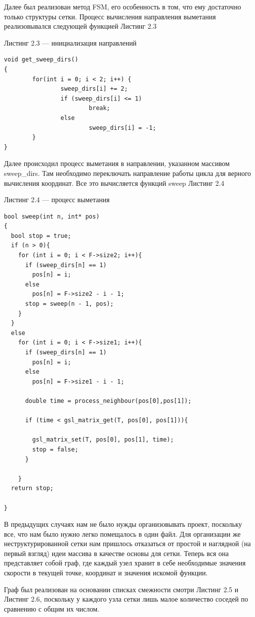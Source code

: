 Далее был реализован метод FSM, его особенность в том, что ему
достаточно только структуры сетки. Процесс вычисления направления
выметания реализовывался следующей функцией Листинг 2.3

\vspace{1em}
Листинг 2.3 --- инициализация направлений
\normalsize
\begin{verbatim} 
void get_sweep_dirs()
{
        for(int i = 0; i < 2; i++) {
                sweep_dirs[i] += 2;
                if (sweep_dirs[i] <= 1)
                        break;
                else
                        sweep_dirs[i] = -1;
        }
}

\end{verbatim}
\large

Далее происходил процесс выметания в направлении, указанном массивом
sweep\_dirs. Там необходимо переключать направление работы цикла для
верного вычисления координат. Все это вычисляется функций sweep
Листинг 2.4


\vspace{1em}
Листинг 2.4 --- процесс выметания
\normalsize
\begin{verbatim} 
bool sweep(int n, int* pos)
{
  bool stop = true;
  if (n > 0){
    for (int i = 0; i < F->size2; i++){
      if (sweep_dirs[n] == 1)
        pos[n] = i;
      else
        pos[n] = F->size2 - i - 1;
      stop = sweep(n - 1, pos);
    }
  }
  else
    for (int i = 0; i < F->size1; i++){
      if (sweep_dirs[n] == 1)
        pos[n] = i;
      else
        pos[n] = F->size1 - i - 1;

      double time = process_neighbour(pos[0],pos[1]);

      if (time < gsl_matrix_get(T, pos[0], pos[1])){
               
        gsl_matrix_set(T, pos[0], pos[1], time);
        stop = false;
      } 

    }
  return stop;

}
\end{verbatim}
\large

В предыдущих случаях нам не было нужды организовывать проект,
поскольку все, что нам было нужно легко помещалось в один файл. Для
организации же неструктурированной сетки нам пришлось отказаться от
простой и наглядной (на первый взгляд) идеи массива в качестве основы
для сетки. Теперь вся она представляет собой граф, где каждый узел
хранит в себе необходимые значения скорости в текущей точке, координат
и значения искомой функции.

Граф был реализован на основании списках смежности смотри Листинг 2.5
и Листинг 2.6, поскольку у
каждого узла сетки лишь малое количество соседей по сравнению с общим
их числом.

